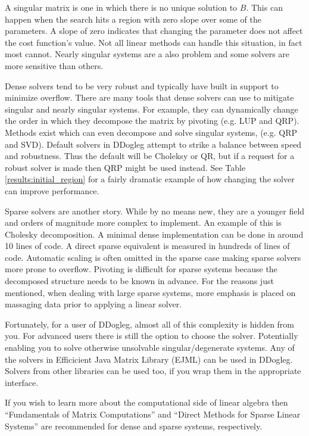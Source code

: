 \documentclass[peerreview,compsoc,onecolumn]{IEEEtran}
\begin{document}
A singular matrix is one in which there is no unique solution to $B$. This can happen when the search hits a region with zero slope over some of the parameters. A slope of zero indicates that changing the parameter does not affect the cost function's value. Not all linear methods can handle this situation, in fact most cannot. Nearly singular systems are a also problem and some solvers are more sensitive than others.

Dense solvers tend to be very robust and typically have built in support to minimize overflow. There are many tools that dense solvers can use to mitigate singular and nearly singular systems. For example, they can dynamically change the order in which they decompose the matrix by pivoting (e.g. LUP and QRP). Methods exist which can even decompose and solve singular systems, (e.g. QRP and SVD). Default solvers in DDogleg attempt to strike a balance between speed and robustness. Thus the default will be Choleksy or QR, but if a request for a robust solver is made then QRP might be used instead. See Table \ref{results:initial_region} for a fairly dramatic example of how changing the solver can improve performance.

Sparse solvers are another story. While by no means new, they are a younger field and orders of magnitude more complex to implement. An example of this is Cholesky decomposition. A minimal dense implementation can be done in around 10 lines of code. A direct sparse equivalent is measured in hundreds of lines of code. Automatic scaling is often omitted in the sparse case making sparse solvers more prone to overflow. Pivoting is difficult for sparse systems because the decomposed structure needs to be known in advance. For the reasons just mentioned, when dealing with large sparse systems, more emphasis is placed on massaging data prior to applying a linear solver. 

Fortunately, for a user of DDogleg, almost all of this complexity is hidden from you. For advanced users there is still the option to choose the solver. Potentially enabling you to solve otherwise unsolvable singular/degenerate systems. Any of the solvers in Efficicient Java Matrix Library (EJML) \cite{ejml2018} can be used in DDogleg. Solvers from other libraries can be used too, if you wrap them in the appropriate interface. 

If you wish to learn more about the computational side of linear algebra then ``Fundamentals of Matrix Computations'' \cite{watkins2010} and ``Direct Methods for Sparse Linear Systems'' \cite{davis2006} are recommended for dense and sparse systems, respectively.
\end{document}
